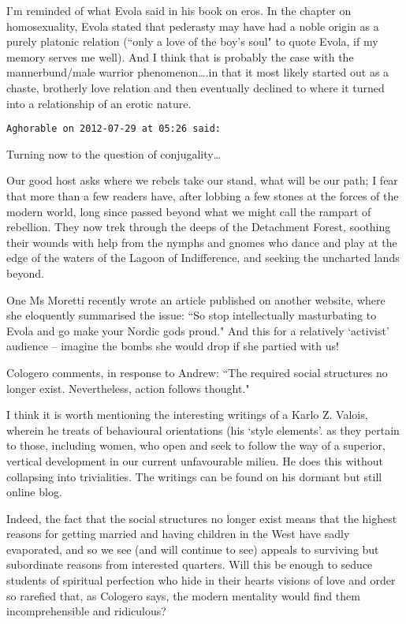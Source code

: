 \begin{footnotesize}
\begin{sffamily}
I'm reminded of what Evola said in his book on eros. In the chapter on homosexuality, Evola stated that pederasty may have had a noble origin as a purely platonic relation (``only a love of the boy's soul" to quote Evola, if my memory serves me well). And I think that is probably the case with the mannerbund/male warrior phenomenon….in that it most likely started out as a chaste, brotherly love relation and then eventually declined to where it turned into a relationship of an erotic nature.


\hfill

\texttt{Aghorable on 2012-07-29 at 05:26 said: }

Turning now to the question of conjugality…

Our good host asks where we rebels take our stand, what will be our path; I fear that more than a few readers have, after lobbing a few stones at the forces of the modern world, long since passed beyond what we might call the rampart of rebellion. They now trek through the deeps of the Detachment Forest, soothing their wounds with help from the nymphs and gnomes who dance and play at the edge of the waters of the Lagoon of Indifference, and seeking the uncharted lands beyond. 

One Ms Moretti recently wrote an article published on another website, where she eloquently summarised the issue: ``So stop intellectually masturbating to Evola and go make your Nordic gods proud." And this for a relatively `activist' audience – imagine the bombs she would drop if she partied with us!

Cologero comments, in response to Andrew: ``The required social structures no longer exist. Nevertheless, action follows thought."

I think it is worth mentioning the interesting writings of a Karlo Z. Valois, wherein he treats of behavioural orientations (his `style elements'. as they pertain to those, including women, who open and seek to follow the way of a superior, vertical development in our current unfavourable milieu. He does this without collapsing into trivialities. The writings can be found on his dormant but still online blog.

Indeed, the fact that the social structures no longer exist means that the highest reasons for getting married and having children in the West have sadly evaporated, and so we see (and will continue to see) appeals to surviving but subordinate reasons from interested quarters. Will this be enough to seduce students of spiritual perfection who hide in their hearts visions of love and order so rarefied that, as Cologero says, the modern mentality would find them incomprehensible and ridiculous? 


\end{sffamily}
\end{footnotesize}

